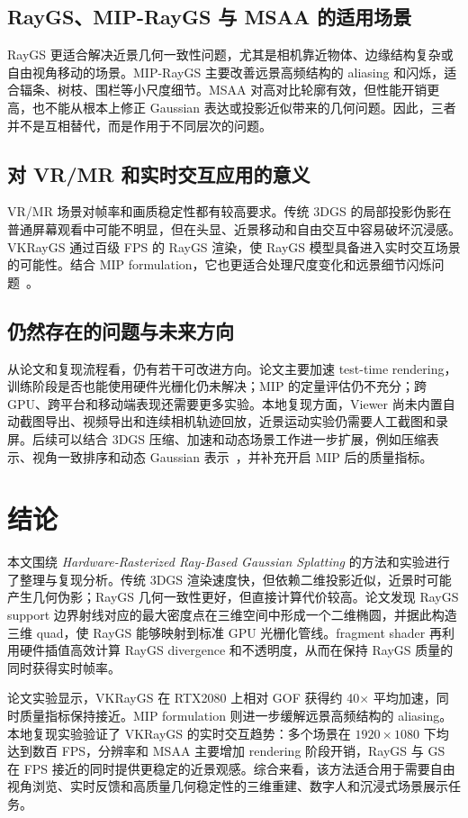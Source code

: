 \documentclass[12pt,hyperref,a4paper,UTF8]{ctexart}
\begin{document}
\subsection{RayGS、MIP-RayGS 与 MSAA 的适用场景}
RayGS 更适合解决近景几何一致性问题，尤其是相机靠近物体、边缘结构复杂或自由视角移动的场景。MIP-RayGS 主要改善远景高频结构的 aliasing 和闪烁，适合辐条、树枝、围栏等小尺度细节。MSAA 对高对比轮廓有效，但性能开销更高，也不能从根本上修正 Gaussian 表达或投影近似带来的几何问题。因此，三者并不是互相替代，而是作用于不同层次的问题。



\subsection{对 VR/MR 和实时交互应用的意义}
VR/MR 场景对帧率和画质稳定性都有较高要求。传统 3DGS 的局部投影伪影在普通屏幕观看中可能不明显，但在头显、近景移动和自由交互中容易破坏沉浸感。VKRayGS 通过百级 FPS 的 RayGS 渲染，使 RayGS 模型具备进入实时交互场景的可能性。结合 MIP formulation，它也更适合处理尺度变化和远景细节闪烁问题~\cite{mipnerf360,mipsplatting}。


\subsection{仍然存在的问题与未来方向}
从论文和复现流程看，仍有若干可改进方向。论文主要加速 test-time rendering，训练阶段是否也能使用硬件光栅化仍未解决；MIP 的定量评估仍不充分；跨 GPU、跨平台和移动端表现还需要更多实验。本地复现方面，Viewer 尚未内置自动截图导出、视频导出和连续相机轨迹回放，近景运动实验仍需要人工截图和录屏。后续可以结合 3DGS 压缩、加速和动态场景工作进一步扩展，例如压缩表示、视角一致排序和动态 Gaussian 表示~\cite{lightgaussian,compressed3dgs,stopthepop,dynamic3dgaussians}，并补充开启 MIP 后的质量指标。



\section{结论}
本文围绕 \emph{Hardware-Rasterized Ray-Based Gaussian Splatting} 的方法和实验进行了整理与复现分析。传统 3DGS 渲染速度快，但依赖二维投影近似，近景时可能产生几何伪影；RayGS 几何一致性更好，但直接计算代价较高。论文发现 RayGS support 边界射线对应的最大密度点在三维空间中形成一个二维椭圆，并据此构造三维 quad，使 RayGS 能够映射到标准 GPU 光栅化管线。fragment shader 再利用硬件插值高效计算 RayGS divergence 和不透明度，从而在保持 RayGS 质量的同时获得实时帧率。

论文实验显示，VKRayGS 在 RTX2080 上相对 GOF 获得约 40$\times$ 平均加速，同时质量指标保持接近。MIP formulation 则进一步缓解远景高频结构的 aliasing。本地复现实验验证了 VKRayGS 的实时交互趋势：多个场景在 $1920\times1080$ 下均达到数百 FPS，分辨率和 MSAA 主要增加 rendering 阶段开销，RayGS 与 GS 在 FPS 接近的同时提供更稳定的近景观感。综合来看，该方法适合用于需要自由视角浏览、实时反馈和高质量几何稳定性的三维重建、数字人和沉浸式场景展示任务。




\end{document}
